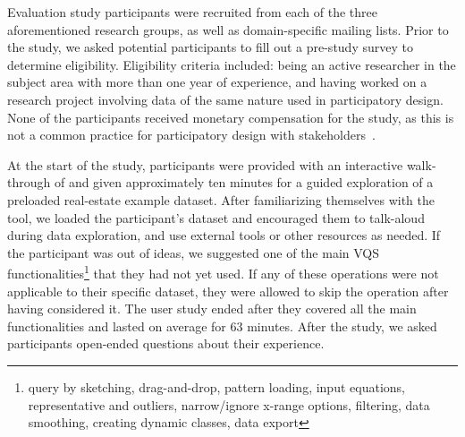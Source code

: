   \par Evaluation study participants were recruited from each of the three aforementioned research groups, as well as domain-specific mailing lists. Prior to the study, we asked potential participants to fill out a pre-study survey to determine eligibility. Eligibility criteria included: being an active researcher in the subject area with more than one year of experience, and having worked on a research project involving data of the same nature used in participatory design. None of the participants received monetary compensation for the study, as this is not a common practice for participatory design with stakeholders~\cite{Ommen2016,McNally2017}. 
  \par At the start of the study, participants were provided with an interactive walk-through of \zvpp and given approximately ten minutes for a guided exploration of a preloaded real-estate example dataset. After familiarizing themselves with the tool, we loaded the participant's dataset and encouraged them to talk-aloud during data exploration, and use external tools or other resources as needed. If the participant was out of ideas, we suggested one of the main VQS functionalities\footnote{query by sketching, drag-and-drop, pattern loading, input equations, representative and outliers, narrow/ignore x-range options, filtering, data smoothing, creating dynamic classes,  data export} that they had not yet used. If any of these operations were not applicable to their specific dataset, they were allowed to skip the operation after having considered it. The user study ended after they covered all the main functionalities and lasted on average for 63 minutes. After the study, we asked participants open-ended questions about their experience.